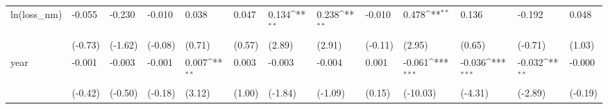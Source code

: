 \def\sym#1{\ifmmode^{#1}\else\(^{#1}\)\fi}
\begin{tabular}{p{1.5cm} p{1.7cm} p{1.7cm} p{1.7cm} p{1.7cm} p{1.7cm} p{1.7cm} p{1.7cm} p{1.7cm} p{1.7cm} p{1.7cm} p{1.7cm} p{1.7cm}}
\hline
ln(loss\_nm)     &   -0.055         &   -0.230         &   -0.010         &    0.038         &    0.047         &    0.134\sym{**} &    0.238\sym{**} &   -0.010         &    0.478\sym{**} &    0.136         &   -0.192         &    0.048         \\
                &  (-0.73)         &  (-1.62)         &  (-0.08)         &   (0.71)         &   (0.57)         &   (2.89)         &   (2.91)         &  (-0.11)         &   (2.95)         &   (0.65)         &  (-0.71)         &   (1.03)         \\
year            &   -0.001         &   -0.003         &   -0.001         &    0.007\sym{**} &    0.003         &   -0.003         &   -0.004         &    0.001         &   -0.061\sym{***}&   -0.036\sym{***}&   -0.032\sym{**} &   -0.000         \\
                &  (-0.42)         &  (-0.50)         &  (-0.18)         &   (3.12)         &   (1.00)         &  (-1.84)         &  (-1.09)         &   (0.15)         & (-10.03)         &  (-4.31)         &  (-2.89)         &  (-0.19)         \\
\end{tabular}
